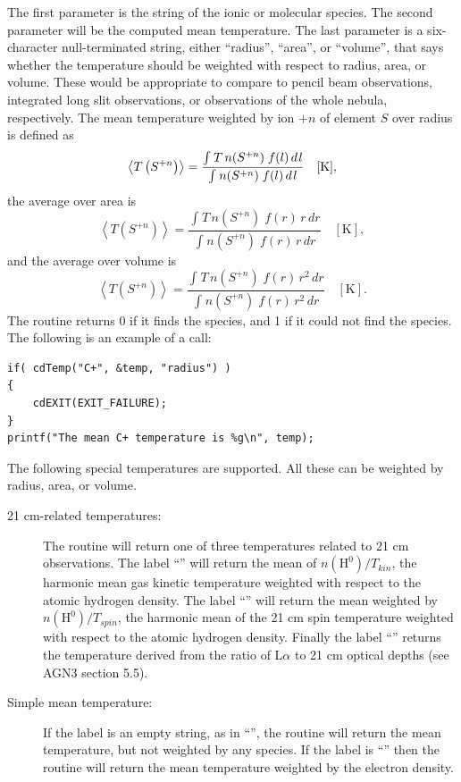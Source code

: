 The first parameter is the string of the ionic or molecular species.
The second parameter will be the computed mean temperature.
The last parameter is a six-character
null-terminated string, either ``radius'', ``area'', or ``volume'', that says whether
the temperature should be weighted with respect to radius, area, or volume.
These would be appropriate to compare to pencil beam observations,
integrated long slit observations, or observations of the whole nebula, respectively.
The mean temperature weighted by ion $+n$ of element $S$ over radius
is defined as
\begin{equation}
\left\langle {T\left( {{S^{ + n}}} \right)} \right\rangle  =
\frac{{\int_{}^{} {T\,n({S^{ + n}})\;f(l)\,d{\kern 1pt} l} }}{{\int_{}^{}
{n({S^{ + n}})\;f(l)\,d{\kern 1pt} l} }}\quad [\mathrm{K}],
\end{equation}
the average over area is
\begin{equation}
\left\langle {T\left( {{S^{ + n}}} \right)} \right\rangle  =
\frac{{\int_{}^{} {T\,n({S^{ + n}})\;f(r)\,r\,dr} }}{{\int_{}^{} {n({S^{ +
n}})\;f(r)\,r\,dr} }}
\quad [\mathrm{K}],
\end{equation}
and the average over volume  is
\begin{equation}
\left\langle {T\left( {{S^{ + n}}} \right)} \right\rangle  =
\frac{{\int_{}^{} {T\,n({S^{ + n}})\;f(r)\,r^2\,dr} }}{{\int_{}^{} {n({S^{ +
n}})\;f(r)\,r^2\,dr} }}
\quad [\mathrm{K}] .
\end{equation}
The routine returns 0 if it finds the species, and 1 if it could not find
the species.  The following is an example of a call:
\begin{verbatim}
if( cdTemp("C+", &temp, "radius") )
{
    cdEXIT(EXIT_FAILURE);
}
printf("The mean C+ temperature is %g\n", temp);
\end{verbatim}
			 
The following special temperatures are supported.
All these can be weighted by radius, area, or volume.
\begin{description}
\item[21 cm-related temperatures:]  The routine will return one of three
temperatures related to 21 cm observations.
The label ``\cdTerm{21cm}'' will return
the mean of $n(\mathrm{H}^0)/T_{kin}$, the harmonic mean gas kinetic temperature weighted
with respect to the atomic hydrogen density.
The label ``'' will return the mean weighted by
$n(\mathrm{H}^0)/T_{spin}$, the harmonic mean of the 21 cm spin temperature weighted with
respect to the atomic hydrogen density.
Finally the label ``'' returns the
temperature derived from the ratio of L$\alpha $ to 21
cm optical depths (see AGN3 section 5.5).

\item[Simple mean temperature:]  If the label is an empty string, as in ``'',
the routine will return the mean temperature, but not weighted by any species.
If the label is ``'' then the routine will return
the mean temperature weighted by the electron density.
\end{description}


